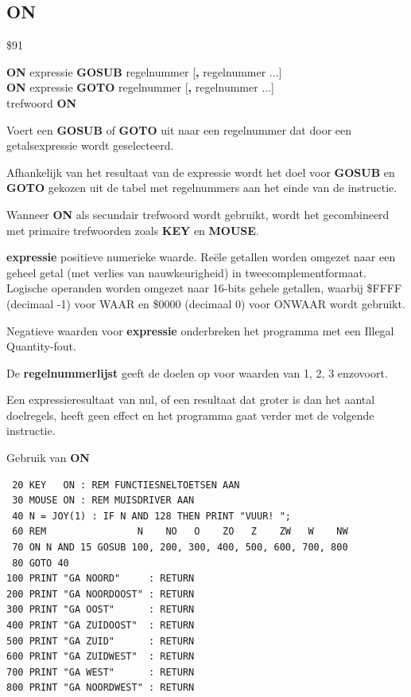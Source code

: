 \subsection{ON}
\begin{description}[leftmargin=2cm,style=nextline]
\item [Token:]    \$91

\item [Formaat:]   {\bf ON} expressie {\bf GOSUB} regelnummer [{\bf,} regelnummer ...] \\                {\bf ON} expressie {\bf GOTO} regelnummer [{\bf,} regelnummer ...] \\                  trefwoord {\bf ON}

\item [Gebruik:]    Voert een {\bf GOSUB} of {\bf GOTO} uit naar een regelnummer dat door een getalsexpressie wordt geselecteerd.

Afhankelijk van het resultaat van de expressie wordt het doel voor {\bf GOSUB} en {\bf GOTO} gekozen uit de tabel met regelnummers aan het einde van de instructie.

                  Wanneer {\bf ON} als secundair trefwoord wordt gebruikt, wordt het gecombineerd met primaire trefwoorden zoals {\bf KEY} en {\bf MOUSE}.

                  {\bf expressie} positieve numerieke waarde. Reële getallen worden omgezet naar een geheel getal (met verlies van nauwkeurigheid) in tweecomplementformaat. Logische operanden worden omgezet naar 16-bits gehele getallen, waarbij \$FFFF (decimaal -1) voor WAAR en \$0000 (decimaal 0) voor ONWAAR wordt gebruikt.

\item [Opmerkingen:]  Negatieve waarden voor {\bf expressie} onderbreken het programma met een Illegal Quantity-fout.

                  De {\bf regelnummerlijst} geeft de doelen op voor waarden van 1, 2, 3 enzovoort.

                  Een expressieresultaat van nul, of een resultaat dat groter is dan het aantal doelregels, heeft geen effect en het programma gaat verder met de volgende instructie.

\item [Voorbeeld:]  Gebruik van {\bf ON}

\begin{tcolorbox}[colback=black,coltext=white]
\verbatimfont{\codefont}
\begin{verbatim}
 20 KEY   ON : REM FUNCTIESNELTOETSEN AAN
 30 MOUSE ON : REM MUISDRIVER AAN
 40 N = JOY(1) : IF N AND 128 THEN PRINT "VUUR! ";
 60 REM                N    NO   O    ZO   Z    ZW   W    NW
 70 ON N AND 15 GOSUB 100, 200, 300, 400, 500, 600, 700, 800
 80 GOTO 40
100 PRINT "GA NOORD"     : RETURN
200 PRINT "GA NOORDOOST" : RETURN
300 PRINT "GA OOST"      : RETURN
400 PRINT "GA ZUIDOOST"  : RETURN
500 PRINT "GA ZUID"      : RETURN
600 PRINT "GA ZUIDWEST"  : RETURN
700 PRINT "GA WEST"      : RETURN
800 PRINT "GA NOORDWEST" : RETURN
\end{verbatim}
\end{tcolorbox}
\end{description}

